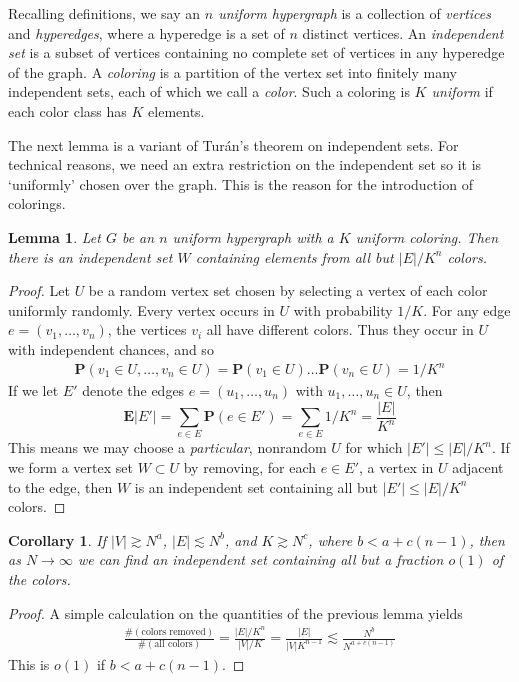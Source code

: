 \documentclass{article}
\theoremstyle{plain}
\newtheorem{lemma}{Lemma}
\newtheorem*{corollary}{Corollary}
\theoremstyle{plain}
\begin{document}
\begin{multicols}{2}
Recalling definitions, we say an {\it $n$ uniform hypergraph} is a collection of {\it vertices} and {\it hyperedges}, where a hyperedge is a set of $n$ distinct vertices. An {\it independent set} is a subset of vertices containing no complete set of vertices in any hyperedge of the graph. A {\it coloring} is a partition of the vertex set into finitely many independent sets, each of which we call a {\it color}. Such a coloring is {\it $K$ uniform} if each color class has $K$ elements.

The next lemma is a variant of Tur\'{a}n's theorem on independent sets. For technical reasons, we need an extra restriction on the independent set so it is `uniformly' chosen over the graph. This is the reason for the introduction of colorings.

\begin{lemma}
	Let $G$ be an $n$ uniform hypergraph with a $K$ uniform coloring. Then there is an independent set $W$ containing elements from all but $|E|/K^n$ colors.
\end{lemma}
\begin{proof}
	Let $U$ be a random vertex set chosen by selecting a vertex of each color uniformly randomly. Every vertex occurs in $U$ with probability $1/K$. For any edge $e = (v_1, \dots, v_n)$, the vertices $v_i$ all have different colors. Thus they occur in $U$ with independent chances, and so
	\begin{align*}
		\mathbf{P}(v_1 \in U, \dots, v_n \in U) = \mathbf{P}(v_1 \in U) \dots \mathbf{P}(v_n \in U) = 1/K^n
	\end{align*}
	If we let $E'$ denote the edges $e = (u_1, \dots, u_n)$ with $u_1, \dots, u_n \in U$, then
	\[ \mathbf{E}|E'| = \sum_{e \in E} \mathbf{P}(e \in E') = \sum_{e \in E} 1/K^n = \frac{|E|}{K^n} \]
	This means we may choose a {\it particular}, nonrandom $U$ for which $|E'| \leq |E|/K^n$. If we form a vertex set $W \subset U$ by removing, for each $e \in E'$, a vertex in $U$ adjacent to the edge, then $W$ is an independent set containing all but $|E'| \leq |E|/K^n$ colors.
\end{proof}

\begin{corollary}
	If $|V| \gtrsim N^a$, $|E| \lesssim N^b$, and $K \gtrsim N^c$, where $b < a + c(n-1)$, then as $N \to \infty$ we can find an independent set containing all but a fraction $o(1)$ of the colors.
\end{corollary}
\begin{proof}
	A simple calculation on the quantities of the previous lemma yields
	\begin{align*}
		\frac{\# ( \text{colors removed} )}{\# ( \text{all colors} )} = \frac{|E|/K^n}{|V|/K} = \frac{|E|}{|V|K^{n-1}} \lesssim \frac{N^b}{N^{a + c(n-1)}}
	\end{align*}
	This is $o(1)$ if $b < a + c(n-1)$.
\end{proof}


\end{multicols}
\end{document}
